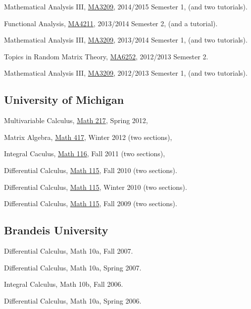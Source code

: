 \begin{item_list}
  Mathematical Analysis III, \href{https://wangd-math.github.io/teaching/MA3209_F14/index.html}{MA3209}, 2014/2015 Semester 1, (and two tutorials).
\item
  Functional Analysis, \href{https://wangd-math.github.io/teaching/MA4211_S14/index.html}{MA4211}, 2013/2014 Semester 2, (and a tutorial).
\item
  Mathematical Analysis III, \href{https://wangd-math.github.io/teaching/MA3209_F13/index.html}{MA3209}, 2013/2014 Semester 1, (and two tutorials).
\item
  Topics in Random Matrix Theory, \href{https://wangd-math.github.io/teaching/MA6252_S13/index.html}{MA6252}, 2012/2013 Semester 2.
\item
  Mathematical Analysis III, \href{https://wangd-math.github.io/teaching/MA3209_F12/index.html}{MA3209}, 2012/2013 Semester 1, (and two tutorials).
\end{item_list}

\subsection*{University of Michigan }

\begin{item_list}
\item Multivariable Calculus, \href{http://instruct.math.lsa.umich.edu/}{Math 217}, Spring 2012,
\item Matrix Algebra, \href{http://www.math.lsa.umich.edu/courses/undergrad.html#417}{Math 417}, Winter 2012 (two sections),
\item Integral Caculus, \href{http://www.math.lsa.umich.edu/courses/116/}{Math 116}, Fall 2011 (two sections),
\item Differential Calculus, \href{http://www.math.lsa.umich.edu/courses/115/}{Math 115}, Fall 2010 (two sections). 
\item Differential Calculus, \href{http://www.math.lsa.umich.edu/courses/115/}{Math 115}, Winter 2010 (two sections). 
\item Differential Calculus, \href{http://www.math.lsa.umich.edu/courses/115/}{Math 115}, Fall 2009 (two sections).
\end{item_list}

\subsection*{Brandeis University }

\begin{item_list}
\item Differential Calculus, Math 10a,
  Fall 2007. 
\item Differential Calculus, Math 10a,
  Spring 2007. 
\item Integral Calculus, Math 10b,
  Fall 2006.
\item Differential Calculus, Math 10a,
  Spring 2006.
\end{item_list}


